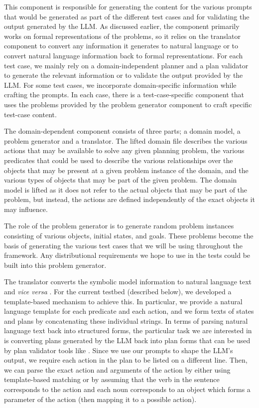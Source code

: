 This component is responsible for generating the content for the various prompts that would be generated as part of the different test cases and for validating the output generated by the LLM. As discussed earlier, the component primarily works on formal representations of the problems, so it relies on the translator component to convert any information it generates to natural language or to convert natural language information back to formal representations.
For each test case, we mainly rely on a domain-independent planner and a plan validator to generate the relevant information or to validate the output provided by the LLM. For some test cases, we incorporate domain-specific information while crafting the prompts. In each case, there is a test-case-specific component that uses the problems provided by the problem generator component to craft specific test-case content.

 The domain-dependent component consists of three parts; a domain model, a problem generator and a translator. The lifted domain file describes the various actions that may be available to solve any given planning problem, the various predicates that could be used to describe the various relationships over the objects that may be present at a given problem instance of the domain, and the various types of objects that may be part of the given problem. The domain model is lifted as it does not refer to the actual objects that may be part of the problem, but instead, the actions are defined independently of the exact objects it may influence. 

The role of the problem generator is to generate random problem instances consisting of various objects, initial states, and goals. These problems become the basis of generating the various test cases that we will be using throughout the framework. Any distributional requirements we hope to use in the tests could be built into this problem generator.

The translator converts the symbolic model information to natural language text and {\em vice versa }. 
For the current testbed (described below), we developed a template-based mechanism to achieve this. In particular, we provide a natural language template for each predicate and each action, and we form texts of states and plans by concatenating these individual strings. In terms of parsing natural language text back into structured forms, the particular task we are interested in is converting plans generated by the LLM back into plan forms that can be used by plan validator tools like \cite{howey2004val}. Since we use our prompts to shape the LLM's output, we require each action in the plan to be listed on a different line. Then, we can parse the exact action and arguments of the action by either using template-based matching or by assuming that the verb in the sentence corresponds to the action and each noun corresponds to an object which forms a parameter of the action (then mapping it to a possible action). 

